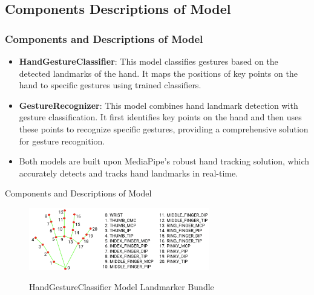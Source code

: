 \documentclass[aspectratio=169, hideothersubsections]{beamer}
\begin{document}
\subsection{Components Descriptions of Model}
\begin{frame}
    \frametitle{Components and Descriptions of Model}
    \begin{itemize}
        \item \textbf{HandGestureClassifier}: This model classifies gestures based on the detected landmarks of the hand. It maps the positions of key points on the hand to specific gestures using trained classifiers.
        \item \textbf{GestureRecognizer}: This model combines hand landmark detection with gesture classification. It first identifies key points on the hand and then uses these points to recognize specific gestures, providing a comprehensive solution for gesture recognition.
        \item Both models are built upon MediaPipe's robust hand tracking solution, which accurately detects and tracks hand landmarks in real-time.
    \end{itemize}
\end{frame}

\begin{frame}{Components and Descriptions of Model}
\begin{figure}
  \centering
  \includegraphics[width=0.7\textwidth]{key.png}
  \label{fig:example}
  \caption{HandGestureClassifier Model Landmarker Bundle}
\end{figure}
\end{frame}
\end{document}
